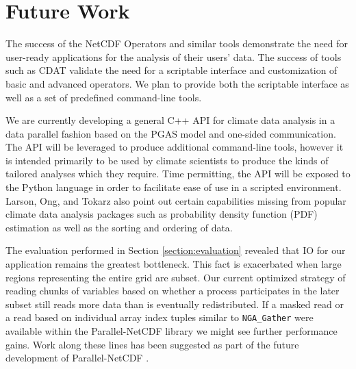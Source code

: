 \section{Future Work}
\label{section:future}

The success of the NetCDF Operators\cite{NCO} and similar tools demonstrate
the need for user-ready applications for the analysis of their users' data.
The success of tools such as CDAT\cite{CDAT} validate the need for a
scriptable interface and customization of basic and advanced operators.  We
plan to provide both the scriptable interface as well as a set of predefined
command-line tools.

We are currently developing a general C++ API for climate data analysis in a
data parallel fashion based on the PGAS model and one-sided communication.
The API will be leveraged to produce additional command-line tools, however it
is intended primarily to be used by climate scientists to produce the kinds of
tailored analyses which they require.  Time permitting, the API will be
exposed to the Python language in order to facilitate ease of use in a
scripted environment.  Larson, Ong, and Tokarz also point out certain
capabilities missing from popular climate data analysis packages such as
probability density function (PDF) estimation as well as the sorting and
ordering of data.

The evaluation performed in Section \ref{section:evaluation} revealed that IO
for our application remains the greatest bottleneck.  This fact is exacerbated
when large regions representing the entire grid are subset.  Our current
optimized strategy of reading chunks of variables based on whether a process
participates in the later subset still reads more data than is eventually
redistributed.  If a masked read or a read based on individual array index
tuples similar to \verb+NGA_Gather+ were available within the Parallel-NetCDF
library we might see further performance gains.  Work along these lines has
been suggested as part of the future development of Parallel-NetCDF
\cite{PNETCDFOPT}.

